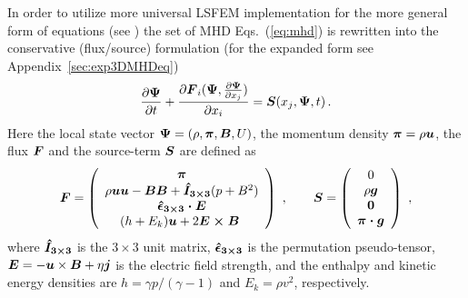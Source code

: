 In order to utilize more universal LSFEM implementation for the more general form of equations (see \cite{Lukin:2008}) the set of MHD
Eqs.~(\ref{eq:mhd}) is rewritten into the conservative (flux/source) formulation (for the expanded form see Appendix~\ref{sec:exp3DMHDeq})
\begin{equation}
\label{eq:MHDcons}
\frac{\partial \boldsymbol{\Psi}}{\partial t}
+\frac{\partial \boldsymbol{F}_i(\boldsymbol{\Psi},\frac{\partial \boldsymbol{\Psi}}{\partial x_j})}{\partial x_i}
=\boldsymbol{S}(x_j,\boldsymbol{\Psi},t)\,.
\end{equation}
Here the local state vector $\boldsymbol{\Psi} = (\rho,\boldsymbol{\pi},\boldsymbol{B},U)$, the momentum density $\boldsymbol{\pi}=\rho\boldsymbol{u}$, the flux $\boldsymbol{F}$ and the source-term
$\boldsymbol{S}$ are defined as
\begin{eqnarray}
\label{eq:MHDFluxSource}
  \boldsymbol{F}=\left(
  \begin{array}{c}
    \boldsymbol{\pi}\\
    \rho\boldsymbol{u}\boldsymbol{u}-\boldsymbol{B}\boldsymbol{B}
    +\boldsymbol{\hat{I}_{3\times3}}(p+B^2)\\
    \boldsymbol{\hat{\epsilon}_{3\times 3} \cdot E}\\
    (h+E_k)\boldsymbol{u}+2\boldsymbol{E\times B}\
  \end{array}
  \right) \ ,\qquad
  \boldsymbol{S}=\left(
  \begin{array}{c}
     0\\
     \rho\boldsymbol{g}\\
     \boldsymbol{0}\\
     \boldsymbol{\pi \cdot g}
  \end{array}
  \right) \ ,
\end{eqnarray}
where $\boldsymbol{\hat{I}_{3\times3}}$ is the $3\times 3$ unit matrix, $\boldsymbol{\hat{\epsilon}_{3\times 3}}$ is the permutation pseudo-tensor, $\boldsymbol{E}=-\boldsymbol{u}\times
\boldsymbol{B}+\eta\boldsymbol{j}$ is the electric field strength, and the enthalpy and kinetic energy densities are $h=\gamma p/(\gamma-1)$ and $E_k=\rho v^2$, 
respectively.